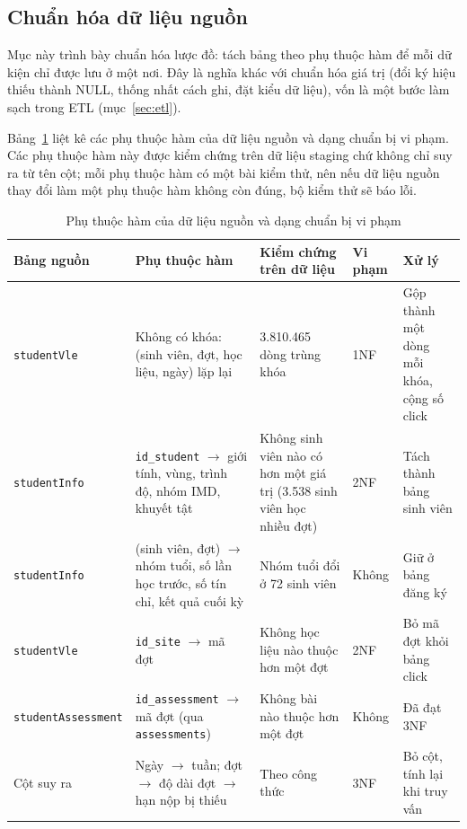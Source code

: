 \subsection{Chuẩn hóa dữ liệu nguồn}
\label{sec:chuan-hoa}

Mục này trình bày chuẩn hóa lược đồ: tách bảng theo phụ thuộc hàm để mỗi dữ kiện chỉ được lưu ở một nơi. Đây là nghĩa khác với chuẩn hóa giá trị (đổi ký hiệu thiếu thành NULL, thống nhất cách ghi, đặt kiểu dữ liệu), vốn là một bước làm sạch trong ETL (mục~\ref{sec:etl}).

Bảng~\ref{tab:phu-thuoc-ham} liệt kê các phụ thuộc hàm của dữ liệu nguồn và dạng chuẩn bị vi phạm. Các phụ thuộc hàm này được kiểm chứng trên dữ liệu staging chứ không chỉ suy ra từ tên cột; mỗi phụ thuộc hàm có một bài kiểm thử, nên nếu dữ liệu nguồn thay đổi làm một phụ thuộc hàm không còn đúng, bộ kiểm thử sẽ báo lỗi.

\begin{table}[htbp]
\centering
\footnotesize
\begin{tabularx}{\textwidth}{|p{2.7cm}|X|p{2.7cm}|p{1.2cm}|p{2.7cm}|}
\hline
\textbf{Bảng nguồn} & \textbf{Phụ thuộc hàm} & \textbf{Kiểm chứng trên dữ liệu} & \textbf{Vi phạm} & \textbf{Xử lý} \\ \hline
\texttt{studentVle} & Không có khóa: (sinh viên, đợt, học liệu, ngày) lặp lại & 3.810.465 dòng trùng khóa & 1NF & Gộp thành một dòng mỗi khóa, cộng số click \\ \hline
\texttt{studentInfo} & \texttt{id\_student} $\rightarrow$ giới tính, vùng, trình độ, nhóm IMD, khuyết tật & Không sinh viên nào có hơn một giá trị (3.538 sinh viên học nhiều đợt) & 2NF & Tách thành bảng sinh viên \\ \hline
\texttt{studentInfo} & (sinh viên, đợt) $\rightarrow$ nhóm tuổi, số lần học trước, số tín chỉ, kết quả cuối kỳ & Nhóm tuổi đổi ở 72 sinh viên & Không & Giữ ở bảng đăng ký \\ \hline
\texttt{studentVle} & \texttt{id\_site} $\rightarrow$ mã đợt & Không học liệu nào thuộc hơn một đợt & 2NF & Bỏ mã đợt khỏi bảng click \\ \hline
\texttt{studentAssessment} & \texttt{id\_assessment} $\rightarrow$ mã đợt (qua \texttt{assessments}) & Không bài nào thuộc hơn một đợt & Không & Đã đạt 3NF \\ \hline
Cột suy ra & Ngày $\rightarrow$ tuần; đợt $\rightarrow$ độ dài đợt $\rightarrow$ hạn nộp bị thiếu & Theo công thức & 3NF & Bỏ cột, tính lại khi truy vấn \\ \hline
\end{tabularx}
\caption{Phụ thuộc hàm của dữ liệu nguồn và dạng chuẩn bị vi phạm}
\label{tab:phu-thuoc-ham}
\end{table}

